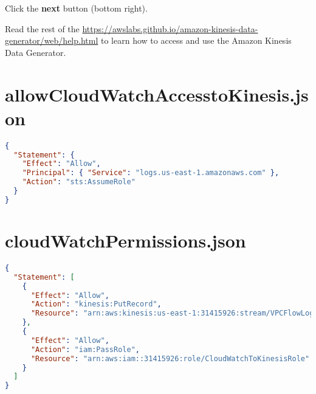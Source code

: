 Click the \textbf{next} button (bottom right).

Read the rest of the \scriptsize{\url{https://awslabs.github.io/amazon-kinesis-data-generator/web/help.html}} to learn how to access and use the Amazon Kinesis Data Generator.

\section{allowCloudWatchAccesstoKinesis.json}
\begin{lstlisting}[language=json]
{
  "Statement": {
    "Effect": "Allow",
    "Principal": { "Service": "logs.us-east-1.amazonaws.com" },
    "Action": "sts:AssumeRole"
  }
}
\end{lstlisting}

\section{cloudWatchPermissions.json}
\begin{lstlisting}[language=json]
{
  "Statement": [
    {
      "Effect": "Allow",
      "Action": "kinesis:PutRecord",
      "Resource": "arn:aws:kinesis:us-east-1:31415926:stream/VPCFlowLogs"
    },
    {
      "Effect": "Allow",
      "Action": "iam:PassRole",
      "Resource": "arn:aws:iam::31415926:role/CloudWatchToKinesisRole"
    }
  ]
}
\end{lstlisting}